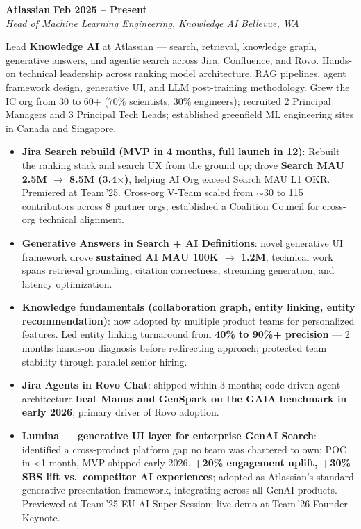 \documentclass[10.5pt,letterpaper]{article}
\newcommand{\role}[4]{%
  \noindent\textbf{#1} \hfill \textbf{#3}\\
  \textit{#2} \hfill \textit{#4}\par\vspace{2pt}}
\begin{document}
\role{Atlassian}{Head of Machine Learning Engineering, Knowledge AI}{Feb 2025 -- Present}{Bellevue, WA}
Lead \textbf{Knowledge AI} at Atlassian --- search, retrieval, knowledge graph, generative answers, and agentic search across Jira, Confluence, and Rovo. Hands-on technical leadership across ranking model architecture, RAG pipelines, agent framework design, generative UI, and LLM post-training methodology. Grew the IC org from 30 to 60+ (70\% scientists, 30\% engineers); recruited 2 Principal Managers and 3 Principal Tech Leads; established greenfield ML engineering sites in Canada and Singapore.
\begin{itemize}
  \item \textbf{Jira Search rebuild (MVP in 4 months, full launch in 12)}: Rebuilt the ranking stack and search UX from the ground up; drove \textbf{Search MAU 2.5M $\to$ 8.5M (3.4$\times$)}, helping AI Org exceed Search MAU L1 OKR. Premiered at Team\,'25. Cross-org V-Team scaled from $\sim$30 to 115 contributors across 8 partner orgs; established a Coalition Council for cross-org technical alignment.
  \item \textbf{Generative Answers in Search + AI Definitions}: novel generative UI framework drove \textbf{sustained AI MAU 100K $\to$ 1.2M}; technical work spans retrieval grounding, citation correctness, streaming generation, and latency optimization.
  \item \textbf{Knowledge fundamentals (collaboration graph, entity linking, entity recommendation)}: now adopted by multiple product teams for personalized features. Led entity linking turnaround from \textbf{40\% to 90\%+ precision} --- 2 months hands-on diagnosis before redirecting approach; protected team stability through parallel senior hiring.
  \item \textbf{Jira Agents in Rovo Chat}: shipped within 3 months; code-driven agent architecture \textbf{beat Manus and GenSpark on the GAIA benchmark in early 2026}; primary driver of Rovo adoption.
  \item \textbf{Lumina --- generative UI layer for enterprise GenAI Search}: identified a cross-product platform gap no team was chartered to own; POC in <1 month, MVP shipped early 2026. \textbf{+20\% engagement uplift, +30\% SBS lift vs.\ competitor AI experiences}; adopted as Atlassian's standard generative presentation framework, integrating across all GenAI products. Previewed at Team\,'25 EU AI Super Session; live demo at Team\,'26 Founder Keynote.
\end{itemize}
\end{document}

